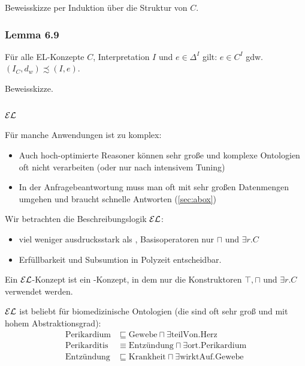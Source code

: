 Beweisskizze per Induktion über die Struktur von $C$.

\hypertarget{lemma-6.9}{\subsubsection{Lemma 6.9}\label{lemma-6.9}}

Für alle EL-Konzepte $C$, Interpretation $I$ und
$e \in \Delta^{I}$ gilt: $e \in C^{I}$ gdw.
$\left( I_{C},d_{w} \right) \precsim \left( I,e \right)$.

Beweisskizze.
\subsection{\texorpdfstring{$\EL$}{EL}}\label{sec:el}

Für manche Anwendungen ist \ALC zu komplex:
\begin{itemize}
    \item Auch hoch-optimierte Reasoner können sehr große und komplexe Ontologien oft nicht verarbeiten (oder nur nach intensivem Tuning)
    \item In der Anfragebeantwortung muss man oft mit sehr großen Datenmengen umgehen und braucht schnelle Antworten (\autoref{sec:abox})
\end{itemize}

Wir betrachten die Beschreibungslogik $\EL$:
\begin{itemize}
    \item viel weniger ausdrucksstark als \ALC, Basisoperatoren nur $\sqcap$ und $\exists r.C$
    \item Erfüllbarkeit und Subsumtion in Polyzeit entscheidbar.
\end{itemize}

\begin{definition}[$\EL$]
Ein $\EL$-Konzept ist ein \ALC-Konzept, in dem nur die Konstruktoren
$\top, \sqcap$ und $\exists r.C$ verwendet werden.
\end{definition}

$\EL$ ist beliebt für biomedizinische Ontologien (die sind oft sehr groß und mit hohem Abstraktionsgrad):
\begin{align*}
    \text{Perikardium} &\sqsubseteq \text{Gewebe} \sqcap \exists \text{teilVon}.\text{Herz}\\
    \text{Perikarditis} &\equiv \text{Entzündung} \sqcap \exists \text{ort}.\text{Perikardium}\\
    \text{Entzündung} & \sqsubseteq \text{Krankheit} \sqcap \exists \text{wirktAuf}.\text{Gewebe}
\end{align*}

